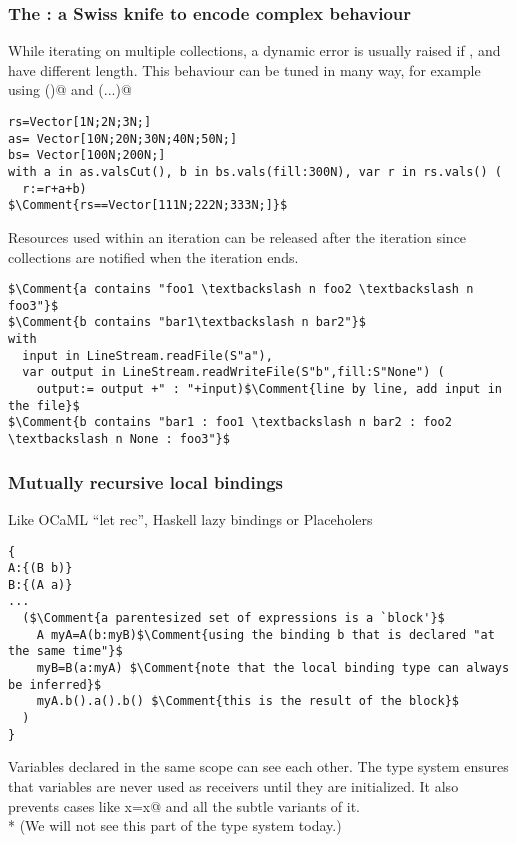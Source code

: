 \begin{frame}[fragile]
\frametitle{The \Q@with@: a Swiss knife to encode complex behaviour}
While iterating on multiple collections, a dynamic error is usually raised if \Q@rs@, \Q@as@ and \Q@bs@ have different length.
This behaviour can be tuned in many way, for example using \Q@cut()@ and \Q@fill(...)@

\begin{NiceCode}{59ex}{0.8}
\begin{lstlisting}
rs=Vector[1N;2N;3N;]
as= Vector[10N;20N;30N;40N;50N;]
bs= Vector[100N;200N;]
with a in as.valsCut(), b in bs.vals(fill:300N), var r in rs.vals() (
  r:=r+a+b)
$\Comment{rs==Vector[111N;222N;333N;]}$
\end{lstlisting}
\end{NiceCode}
Resources used within an iteration can be released after the iteration 
since collections are notified when the iteration ends.
\begin{NiceCode}{59ex}{0.8}
\begin{lstlisting}
$\Comment{a contains "foo1 \textbackslash n foo2 \textbackslash n foo3"}$
$\Comment{b contains "bar1\textbackslash n bar2"}$
with 
  input in LineStream.readFile(S"a"), 
  var output in LineStream.readWriteFile(S"b",fill:S"None") (
    output:= output +" : "+input)$\Comment{line by line, add input in the file}$
$\Comment{b contains "bar1 : foo1 \textbackslash n bar2 : foo2 \textbackslash n None : foo3"}$
\end{lstlisting}
\end{NiceCode}
\end{frame}



\begin{frame}[fragile]
\frametitle{Mutually recursive local bindings}
Like OCaML ``let rec'', Haskell lazy bindings or Placeholers

\begin{NiceCode}{59ex}{0.8}
\begin{lstlisting}
{
A:{(B b)}
B:{(A a)}
...
  ($\Comment{a parentesized set of expressions is a `block'}$
    A myA=A(b:myB)$\Comment{using the binding b that is declared "at the same time"}$
    myB=B(a:myA) $\Comment{note that the local binding type can always be inferred}$
    myA.b().a().b() $\Comment{this is the result of the block}$
  )
}
\end{lstlisting}
\end{NiceCode}

Variables declared in the same scope can see each other.
The type system ensures that variables are never used as receivers until they are initialized.
It also prevents cases like \Q@T x=x@ and all the subtle variants of it.
\\*
(We will not see this part of the type system today.)
\end{frame}



